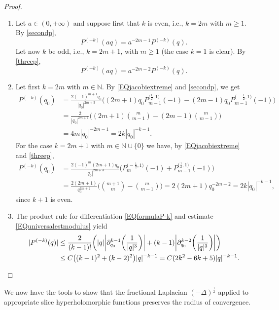 \documentclass[reqno,11pt]{amsart}
\theoremstyle{definition}
\begin{document}
\begin{proof}
	\begin{enumerate}[wide,label=\textnormal{(\roman{*})}]
		\item Let $a\in (0,+\infty)$ and suppose first that $k$ is even, i.e., $k=2m$ with $m \geq 1$. By \eqref{secondp},
		\[
		P^{(-k)}(aq) = a^{-2m-1} P^{(-k)}(q).
		\]
		Let now $k$ be odd, i.e., $k=2m+1$, with $m \geq 1$ (the case $k=1$ is clear). By \eqref{threep},
		\[
		P^{(-k)}(aq) = a^{-2m-2} P^{(-k)}(q).
		\]
		
		\item Let first $k=2m$ with $m \in \mathbb{N}$. By \eqref{EQjacobiextreme} and \eqref{secondp}, we get
		\begin{align*}
			P^{(-k)}(q_0)&=\frac{2 (-1)^{m+1}q_0}{|q_0|^{2m+3}} \bigg((2m+1)q_0 P^{\big(\frac{1}{2},1\big)}_{m-1}(-1)-(2m-1)q_0 P_{m-1}^{\big(-\frac{1}{2},1\big)}(-1)\bigg)\\
			& = \frac{2}{|q_0|^{2m+1}} \bigg((2m+1) \binom{m}{m-1}-(2m-1) \binom{m}{m-1}\bigg)\\
			& =  4m |q_0|^{-2m-1}=2k|q_0|^{-k-1}.
		\end{align*}
		For the case $k=2m+1$ with $m \in \mathbb{N}\cup\{0\}$ we have, by \eqref{EQjacobiextreme} and \eqref{threep},
	\begin{align*}
		P^{(-k)}(q_0)&= \frac{2(-1)^m (2m+1)q_0}{|q_0|^{2m+3}}
		\bigg(P^{\big(-\frac{1}{2},1\big)}_m(-1)+P^{\big(\frac{1}{2},1\big)}_{m-1}(-1)\bigg)\\
		& = \frac{2 (2m+1)}{q_0^{2m+2}} \bigg( \binom{m+1}{m}-\binom{m}{m-1}\bigg) = 2 (2m+1)q_0^{-2m-2} = 2k|q_0|^{-k-1},
	\end{align*}
	since $k+1$ is even.


	\item The product rule for differentiation \eqref{EQformulaP-k} and estimate \eqref{EQuniversalestmodulus} yield
		\begin{align*}
			|P^{(-k)}(q)| &\leq \frac{2}{(k-1)!} \bigg( |q| \bigg|\partial_{q_0}^{k-1}\bigg(\frac{1}{|q|^3}\bigg)\bigg|+(k-1)\bigg|\partial_{q_0}^{k-2}\bigg(\frac{1}{|q|^3}\bigg)\bigg| \bigg)\\
			& \leq C \big( (k-1)^2+(k-2)^2\big)|q|^{-k-1}=C(2k^2-6k+5)|q|^{-k-1}.\qedhere
		\end{align*}
	\end{enumerate}
\end{proof}



We now have the tools to show that the fractional Laplacian $(-\Delta)^\frac{1}{2}$ applied to appropriate slice hyperholomorphic functions preserves the radius of convergence.
\end{document}
